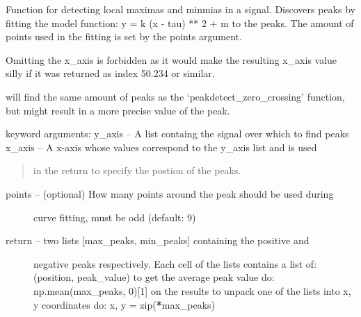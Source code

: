 \documentclass[letterpaper,10pt,english]{sphinxmanual}
\begin{document}

\begin{fulllineitems}
\label{code:peakdet.peakdetect_parabole}
Function for detecting local maximas and minmias in a signal.
Discovers peaks by fitting the model function: y = k (x - tau) ** 2 + m
to the peaks. The amount of points used in the fitting is set by the
points argument.

Omitting the x\_axis is forbidden as it would make the resulting x\_axis
value silly if it was returned as index 50.234 or similar.

will find the same amount of peaks as the `peakdetect\_zero\_crossing'
function, but might result in a more precise value of the peak.

keyword arguments:
y\_axis -- A list containg the signal over which to find peaks
x\_axis -- A x-axis whose values correspond to the y\_axis list and is used
\begin{quote}

in the return to specify the postion of the peaks.
\end{quote}
\begin{description}
\item[{points -- (optional) How many points around the peak should be used during}] \leavevmode
curve fitting, must be odd (default: 9)

\item[{return -- two lists {[}max\_peaks, min\_peaks{]} containing the positive and}] \leavevmode
negative peaks respectively. Each cell of the lists contains a list
of: (position, peak\_value) 
to get the average peak value do: np.mean(max\_peaks, 0){[}1{]} on the
results to unpack one of the lists into x, y coordinates do: 
x, y = zip({\color{red}\bfseries{}*}max\_peaks)

\end{description}

\end{fulllineitems}

\end{document}
